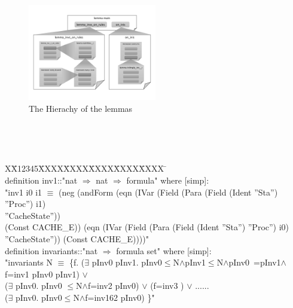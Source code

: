 \documentclass{llncs}
\newlength{\fminilength}
\newenvironment{fmini}[1][\linewidth]
  {\setlength{\fminilength}{#1\fboxsep-2\fboxrule}%
   \vspace{2ex}\noindent\begin{lrbox}{\fminibox}\begin{minipage}{\fminilength}%
   \mbox{ }\hfill\vspace{-2.5ex}}%
  {\end{minipage}\end{lrbox}\vspace{1ex}\hspace{0ex}%
   \framebox{\usebox{\fminibox}}}
\newenvironment{specification}
{\noindent\scriptsize
\tt\begin{fmini}\begin{tabbing}X\=X12345\=XXXX\=XXXX\=XXXX\=XXXX\=XXXX
\=\+\kill} {\end{tabbing}\normalfont\end{fmini}}
\def \pInv {i}
\begin{document}
\vspace{-20pt}

\begin{figure}[htbp]
\centering %


\includegraphics[width=0.5\textwidth]{thy.pdf}
\vspace{-20pt}
\caption{The Hierachy of the lemmas\label{fig:lemmaHierachy}
}
\end{figure}

\vspace{-8pt}
\begin{specification}\\
definition inv1::"nat $\Rightarrow$ nat $\Rightarrow$ formula" where [simp]:\\
"inv1 \pInv0 \pInv1 $\equiv$
(neg (andForm (eqn (IVar (Field (Para (Field (Ident ''Sta'') ''Proc'') \pInv1)\\ ''CacheState''))\\
 (Const CACHE\_E)) (eqn (IVar (Field (Para (Field (Ident ''Sta'') ''Proc'') \pInv0)\\ ''CacheState'')) (Const CACHE\_E))))"\\
definition invariants::"nat $\Rightarrow$ formula set" where [simp]:\\
"invariants N $\equiv$ \{f.
($\exists$ pInv0 pInv1. pInv0$\le$N$\wedge$pInv1$\le$N$\wedge$pInv0~=pInv1$\wedge$f=inv1  pInv0 pInv1) $\vee$\\
($\exists$ pInv0. pInv0 $\le$N$\wedge$f=inv2  pInv0) $\vee$
(f=inv3  ) $\vee$ ......\\
($\exists$ pInv0. pInv0$\le$N$\wedge$f=inv162  pInv0) \}"\\
\end{specification}\\
\vspace{-10pt}
\end{document}
